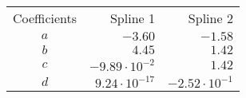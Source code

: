 \begin{tabular}{crr}
    \toprule
    Coefficients & Spline 1 & Spline 2 \\ \otoprule
    $a$ & $-3.60$ & $-1.58$ \\
    $b$ & $4.45$ & $1.42$ \\
    $c$ & $-9.89 \cdot 10^{-2}$ & $1.42$ \\
    $d$ & $9.24 \cdot 10^{-17}$ & $-2.52 \cdot 10^{-1}$ \\
    \bottomrule
\end{tabular}
